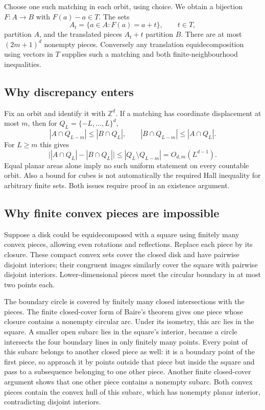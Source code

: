 Choose one such matching in each orbit, using choice. We obtain a bijection $F:A\to B$ with $F(a)-a\in T$. The sets
\[
 A_t=\{a\in A:F(a)=a+t\},\qquad t\in T,
\]
partition $A$, and the translated pieces $A_t+t$ partition $B$. There are at most $(2m+1)^d$ nonempty pieces. Conversely any translation equidecomposition using vectors in $T$ supplies such a matching and both finite-neighbourhood inequalities.

\subsection*{Why discrepancy enters}
Fix an orbit and identify it with $\mathbb Z^d$. If a matching has coordinate displacement at most $m$, then for $Q_L=\{-L,\ldots,L\}^d$,
\[
 |A\cap Q_{L-m}|\le|B\cap Q_L|,\qquad
 |B\cap Q_{L-m}|\le|A\cap Q_L|.
\]
For $L\ge m$ this gives
\[
 \bigl||A\cap Q_L|-|B\cap Q_L|\bigr|
 \le|Q_L\setminus Q_{L-m}|=O_{d,m}(L^{d-1}).
\]
Equal planar areas alone imply no such uniform statement on every countable orbit. Also a bound for cubes is not automatically the required Hall inequality for arbitrary finite sets. Both issues require proof in an existence argument.

\subsection*{Why finite convex pieces are impossible}
Suppose a disk could be equidecomposed with a square using finitely many convex pieces, allowing even rotations and reflections. Replace each piece by its closure. These compact convex sets cover the closed disk and have pairwise disjoint interiors; their congruent images similarly cover the square with pairwise disjoint interiors. Lower-dimensional pieces meet the circular boundary in at most two points each.

The boundary circle is covered by finitely many closed intersections with the pieces. The finite closed-cover form of Baire's theorem gives one piece whose closure contains a nonempty circular arc. Under its isometry, this arc lies in the square. A smaller open subarc lies in the square's interior, because a circle intersects the four boundary lines in only finitely many points.
Every point of this subarc belongs to another closed piece as well: it is a boundary point of the first piece, so approach it by points outside that piece but inside the square and pass to a subsequence belonging to one other piece. Another finite closed-cover argument shows that one other piece contains a nonempty subarc. Both convex pieces contain the convex hull of this subarc, which has nonempty planar interior, contradicting disjoint interiors.

